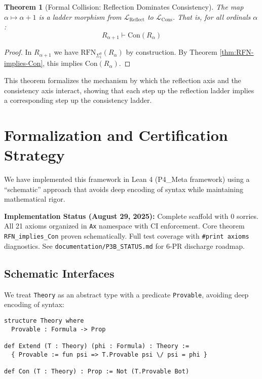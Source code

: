 \documentclass[11pt]{article}
\newtheorem{theorem}{Theorem}[section]
\newcommand{\Con}{\mathrm{Con}}
\newcommand{\RFNSigOne}{\mathrm{RFN}_{\Sigma^0_1}}
\newcommand{\LCons}{\mathcal{L}_{\mathrm{Cons}}}
\newcommand{\LReflect}{\mathcal{L}_{\mathrm{Reflect}}}
\begin{document}
\begin{theorem}[Formal Collision: Reflection Dominates Consistency]
The map $\alpha \mapsto \alpha+1$ is a ladder morphism from $\LReflect$ to $\LCons$. That is, for all ordinals $\alpha$:
$$R_{\alpha+1} \vdash \Con(R_\alpha)$$
\end{theorem}
\begin{proof}
In $R_{\alpha+1}$ we have $\RFNSigOne(R_\alpha)$ by construction. By Theorem \ref{thm:RFN-implies-Con}, this implies $\Con(R_\alpha)$.
\end{proof}

This theorem formalizes the mechanism by which the reflection axis and the consistency axis interact, showing that each step up the reflection ladder implies a corresponding step up the consistency ladder.

\section{Formalization and Certification Strategy}
We have implemented this framework in Lean 4 (P4\_Meta framework) using a ``schematic'' approach that avoids deep encoding of syntax while maintaining mathematical rigor.

\begin{mdframed}[style=provenance]
\textbf{Implementation Status (August 29, 2025):} Complete scaffold with 0 sorries. All 21 axioms organized in \texttt{Ax} namespace with CI enforcement. Core theorem \texttt{RFN\_implies\_Con} proven schematically. Full test coverage with \texttt{\#print axioms} diagnostics. See \texttt{documentation/P3B\_STATUS.md} for 6-PR discharge roadmap.
\end{mdframed}

\subsection{Schematic Interfaces}
We treat \texttt{Theory} as an abstract type with a predicate \texttt{Provable}, avoiding deep encoding of syntax:

\begin{lstlisting}[language=Lean, caption={Core Theory Interface}]
structure Theory where
  Provable : Formula -> Prop

def Extend (T : Theory) (phi : Formula) : Theory :=
  { Provable := fun psi => T.Provable psi \/ psi = phi }

def Con (T : Theory) : Prop := Not (T.Provable Bot)
\end{lstlisting}
\end{document}
